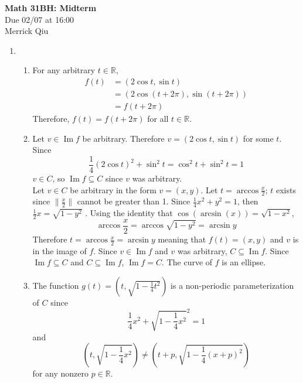 \documentclass{report}
\begin{document}
\begin{center}
	\huge{\bf Math 31BH: Midterm} \\
	Due 02/07 at 16:00 \\
	Merrick Qiu
\end{center}

\bigskip

\begin{enumerate}
	\item 
	\begin{enumerate}
		\item 
		For any arbitrary $t \in \mathbb{R}$,
		\begin{align*}
			f(t)
			&= (2\cos t, \sin t) \\
			&= (2\cos (t+2\pi), \sin (t+2\pi)) \\
			&= f(t+2\pi)
		\end{align*}
		Therefore, $f(t) = f(t+2\pi)$ for all $t \in \mathbb{R}$.

		\item 
		Let $v \in \operatorname{Im} f$ be arbitrary.
		Therefore $v = (2\cos t, \sin t)$ for some $t$.
		Since 
		\[
			\frac{1}{4}(2\cos t)^2 + \sin^2 t
			= \cos^2 t + \sin^2 t 
			= 1
		\]
		$v \in C$, so $\operatorname{Im} f \subseteq C$
		since $v$ was arbitrary. \\

		Let $v \in C$ be arbitrary in the form $ v=(x, y)$.
		Let $t = \arccos \frac{x}{2}$;
		$t$ exists since $\|\frac{x}{2}\|$ cannot be greater than 1.
		Since  $\frac{1}{4}x^2 + y^2 = 1$, then 
		$\frac{1}{2}x = \sqrt{1-y^2}$ .
		Using the identity that $\cos(\arcsin(x)) = \sqrt{1-x^2}$,
		\[
			\arccos \frac{x}{2} 
			= \arccos \sqrt{1-y^2}
			= \arcsin y
		\] 
		Therefore $t = \arccos \frac{x}{2} = \arcsin y$ meaning that $f(t) = (x, y)$
		and $v$ is in the image of $f$.
		Since $v \in \operatorname{Im} f$ and $v$ was arbitrary, 
		$C \subseteq \operatorname{Im} f$.
		Since $\operatorname{Im} f \subseteq C$ and $C \subseteq \operatorname{Im} f$,
		$\operatorname{Im} f = C$. The curve of $f$ is an ellipse.

		\item 
		The function $g(t) = (t, \sqrt{1-\frac{1}{4}t^2})$
		is a non-periodic parameterization of $C$ since 
		\[
			\frac{1}{4}x^2 + \sqrt{1-\frac{1}{4}x^2}^2 = 1
		\]
		and
		\[
			(t, \sqrt{1-\frac{1}{4}x^2}) \neq (t+p, \sqrt{1-\frac{1}{4}(x+p)^2})
		\]
		for any nonzero $p \in \mathbb{R}$.
	\end{enumerate}
	

\end{enumerate}
\end{document}
